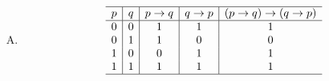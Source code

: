 {{\begin{practices}
\begin{enumerate}[A.]
{\begin{table}[H]
\[\begin{array}{c|c|c|c|c}
                                0 & 1 & 1 & 1 & 1 \\
                                1 & 0 & 0 & 0 & 1 \\
                                1 & 1 & 1 & 1 & 1 \\
                                \hline
                            \end{array}
                        \]
                    \end{table}
                }
                \item
                {
                    \begin{table}[H]
                        \[
                            \begin{array}{c|c|c|c|c}
                                \hline
                                p & q & p \rightarrow q & q \rightarrow p & (p \rightarrow q) \rightarrow (q \rightarrow p) \\
                                \hline
                                0 & 0 & 1 & 1 & 1 \\
                                0 & 1 & 1 & 0 & 0 \\
                                1 & 0 & 0 & 1 & 1 \\
                                1 & 1 & 1 & 1 & 1 \\
                                \hline
                            \end{array}
                        \]
                    \end{table}
                }
            \end{enumerate}
        \end{practices}

}}
